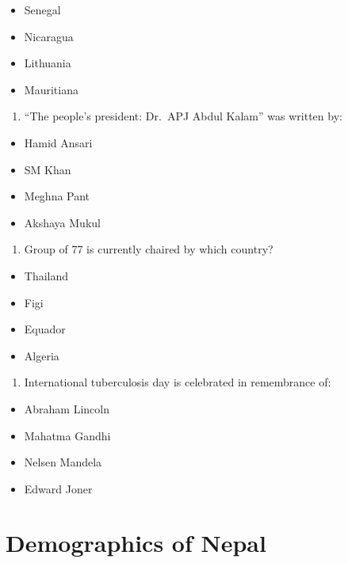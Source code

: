 \documentclass[
]{book}
\providecommand{\tightlist}{%
  \setlength{\itemsep}{0pt}\setlength{\parskip}{0pt}}
\begin{document}
\begin{itemize}
\tightlist
\item
  Senegal
\item
  Nicaragua
\item
  Lithuania
\item
  Mauritiana
\end{itemize}

\begin{enumerate}
\def\labelenumi{\arabic{enumi}.}
\setcounter{enumi}{7}
\tightlist
\item
  ``The people's president: Dr.~APJ Abdul Kalam'' was written by:
\end{enumerate}

\begin{itemize}
\tightlist
\item
  Hamid Ansari
\item
  SM Khan
\item
  Meghna Pant
\item
  Akshaya Mukul
\end{itemize}

\begin{enumerate}
\def\labelenumi{\arabic{enumi}.}
\setcounter{enumi}{8}
\tightlist
\item
  Group of 77 is currently chaired by which country?
\end{enumerate}

\begin{itemize}
\tightlist
\item
  Thailand
\item
  Figi
\item
  Equador
\item
  Algeria
\end{itemize}

\begin{enumerate}
\def\labelenumi{\arabic{enumi}.}
\setcounter{enumi}{9}
\tightlist
\item
  International tuberculosis day is celebrated in remembrance of:
\end{enumerate}

\begin{itemize}
\tightlist
\item
  Abraham Lincoln
\item
  Mahatma Gandhi
\item
  Nelsen Mandela
\item
  Edward Joner
\end{itemize}

\hypertarget{demographics-of-nepal}{%
\section{Demographics of Nepal}\label{demographics-of-nepal}}
\end{document}
